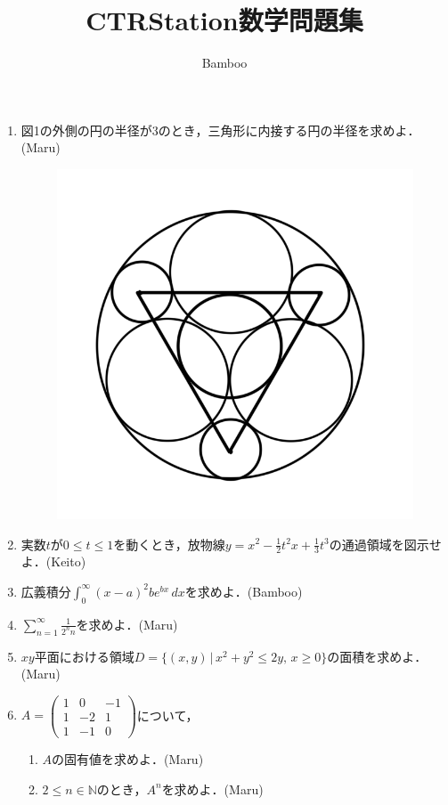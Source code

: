 \documentclass{ltjsarticle}
\title{CTRStation数学問題集}
\author{Bamboo}
\begin{document}
\maketitle

\begin{enumerate}
  \setlength{\parskip}{4cm}
  \everymath{\displaystyle}

  \item 図1の外側の円の半径が3のとき，三角形に内接する円の半径を求めよ．(Maru)

  \begin{figure}[htbp]
  \centering
  \includegraphics[scale=0.3]{radius.png}
  \caption{}
  \end{figure}

  \item 実数$t$が$0\le t\le1$を動くとき，放物線$y=x^2-\frac{1}{2}t^2x+\frac{1}{3}t^3$の通過領域を図示せよ．(Keito)
  \item 広義積分$\int_{0}^{∞}(x-a)^2be^{bx}\,dx$を求めよ．(Bamboo)
  \item $\sum_{n=1}^\infty \frac{1}{2^nn}$を求めよ．(Maru)
  \item $xy$平面における領域$D=\{(x,y)\,|\,x^2+y^2\le2y,\,x\ge0\}$の面積を求めよ．(Maru)

  \item $A=\begin{pmatrix}
    1 & 0 & -1 \\
    1 & -2 & 1 \\
    1 & -1 & 0
  \end{pmatrix}$について，
  \setlength{\parskip}{1.8cm}
  \begin{enumerate}
    \setlength{\parskip}{4cm}
    \item $A$の固有値を求めよ．(Maru)
    \item $2\le n\in \mathbb{N}$のとき，$A^n$を求めよ．(Maru)
  \end{enumerate}


\end{enumerate}
\end{document}
